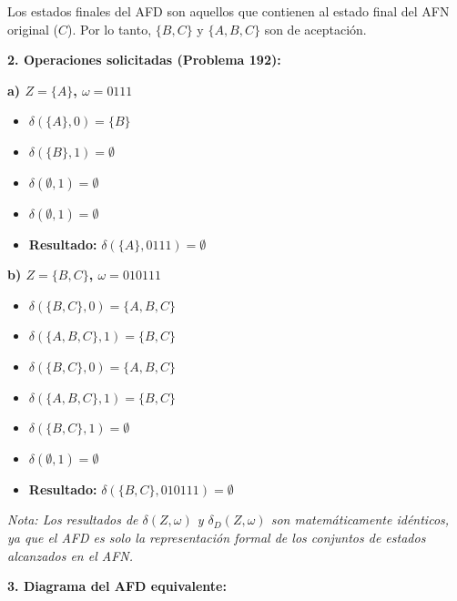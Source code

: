 \documentclass[12pt]{article}
\begin{document}
Los estados finales del AFD son aquellos que contienen al estado final del AFN original ($C$). Por lo tanto, $\{B, C\}$ y $\{A, B, C\}$ son de aceptación.

\vspace{0.5cm}

\textbf{2. Operaciones solicitadas (Problema 192):}

\textbf{a) $Z=\{A\}$, $\omega=0111$}
\begin{itemize}
    \item $\delta(\{A\}, 0) = \{B\}$
    \item $\delta(\{B\}, 1) = \emptyset$
    \item $\delta(\emptyset, 1) = \emptyset$
    \item $\delta(\emptyset, 1) = \emptyset$
    \item \textbf{Resultado:} $\delta(\{A\}, 0111) = \emptyset$
\end{itemize}

\textbf{b) $Z=\{B,C\}$, $\omega=010111$}
\begin{itemize}
    \item $\delta(\{B,C\}, 0) = \{A, B, C\}$
    \item $\delta(\{A, B, C\}, 1) = \{B, C\}$
    \item $\delta(\{B, C\}, 0) = \{A, B, C\}$
    \item $\delta(\{A, B, C\}, 1) = \{B, C\}$
    \item $\delta(\{B, C\}, 1) = \emptyset$
    \item $\delta(\emptyset, 1) = \emptyset$
    \item \textbf{Resultado:} $\delta(\{B,C\}, 010111) = \emptyset$
\end{itemize}

\textit{Nota: Los resultados de $\delta(Z, \omega)$ y $\delta_D(Z, \omega)$ son matemáticamente idénticos, ya que el AFD es solo la representación formal de los conjuntos de estados alcanzados en el AFN.}

\vspace{0.5cm}

\textbf{3. Diagrama del AFD equivalente:}
\end{document}
